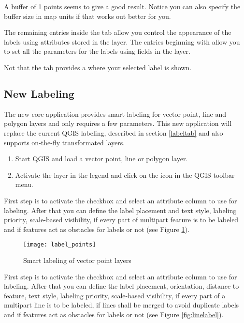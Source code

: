 A buffer of 1 points seems to give a good result.
Notice you can also specify the buffer size in map units if that works out
better for you.

The remaining entries inside the  tab allow you control the appearance of the
labels using attributes stored in the layer. The entries beginning with  allow you to
set all the parameters for the labels using fields in the layer.

Not that the  tab provides a  where your
selected label is shown.

\subsection{New Labeling}\label{newlabel}

The new  core application provides smart labeling
for vector point,  line and polygon layers and only requires a few parameters.
This new application will replace the current QGIS labeling, described in section
\ref{labeltab} and also supports on-the-fly transformated layers.


\begin{enumerate}
  \item Start QGIS and load a vector point, line or polygon layer.
  \item Activate the layer in the legend and click on the
   icon in the QGIS toolbar menu.
\end{enumerate}


First step is to activate the  checkbox and select an attribute
column to use for labeling. After that you can define the label placement and text style,
labeling priority, scale-based visibility, if every part of multipart feature is to be
labeled and if features act as obstacles for labels or not (see
Figure \ref{fig:pointlabel}).

\begin{figure}[ht]
\centering
   \texttt{[image: label\_points]}
   \caption{Smart labeling of vector point layers \nixcaption}\label{fig:pointlabel}
\end{figure}


First step is to activate the  checkbox and select an attribute
column to use for labeling. After that you can define the label placement, orientation,
distance to feature, text style, labeling priority, scale-based visibility, if every part
of a multipart line is to be labeled, if lines shall be merged to avoid duplicate labels
and if features act as obstacles for labels or not (see Figure \ref{fig:linelabel}).

